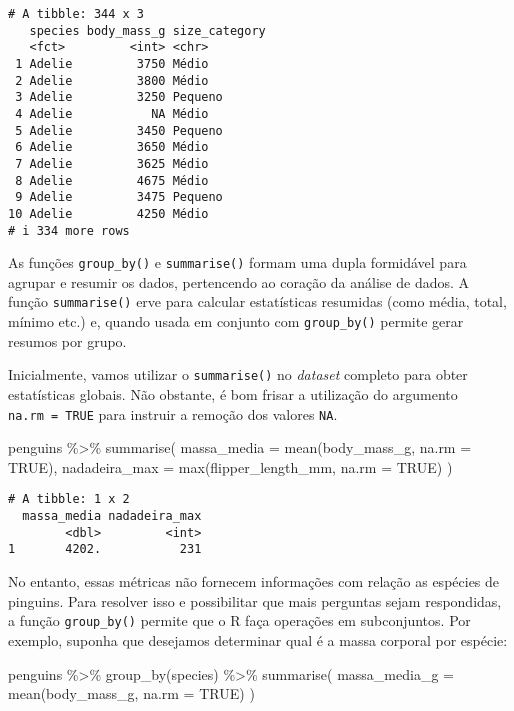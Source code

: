 \documentclass[
  12pt,
  letterpaper,
  DIV=11,
  numbers=noendperiod]{scrreprt}
\newenvironment{Shaded}{\begin{snugshade}}{\end{snugshade}}
\newcommand{\AttributeTok}[1]{\textcolor[rgb]{0.40,0.45,0.13}{#1}}
\newcommand{\ConstantTok}[1]{\textcolor[rgb]{0.56,0.35,0.01}{#1}}
\newcommand{\FunctionTok}[1]{\textcolor[rgb]{0.28,0.35,0.67}{#1}}
\newcommand{\NormalTok}[1]{\textcolor[rgb]{0.00,0.23,0.31}{#1}}
\newcommand{\SpecialCharTok}[1]{\textcolor[rgb]{0.37,0.37,0.37}{#1}}
\begin{document}
\begin{verbatim}
# A tibble: 344 x 3
   species body_mass_g size_category
   <fct>         <int> <chr>        
 1 Adelie         3750 Médio        
 2 Adelie         3800 Médio        
 3 Adelie         3250 Pequeno      
 4 Adelie           NA Médio        
 5 Adelie         3450 Pequeno      
 6 Adelie         3650 Médio        
 7 Adelie         3625 Médio        
 8 Adelie         4675 Médio        
 9 Adelie         3475 Pequeno      
10 Adelie         4250 Médio        
# i 334 more rows
\end{verbatim}

As funções \texttt{group\_by()} e \texttt{summarise()} formam uma dupla
formidável para agrupar e resumir os dados, pertencendo ao coração da
análise de dados. A função \texttt{summarise()} erve para calcular
estatísticas resumidas (como média, total, mínimo etc.) e, quando usada
em conjunto com \texttt{group\_by()} permite gerar resumos por grupo.

Inicialmente, vamos utilizar o \texttt{summarise()} no \emph{dataset}
completo para obter estatísticas globais. Não obstante, é bom frisar a
utilização do argumento \texttt{na.rm\ =\ TRUE} para instruir a remoção
dos valores \texttt{NA}.

\begin{Shaded}
\begin{Highlighting}[]
\NormalTok{penguins }\SpecialCharTok{\%\textgreater{}\%} 
  \FunctionTok{summarise}\NormalTok{(}
    \AttributeTok{massa\_media =} \FunctionTok{mean}\NormalTok{(body\_mass\_g, }\AttributeTok{na.rm =} \ConstantTok{TRUE}\NormalTok{),}
    \AttributeTok{nadadeira\_max =} \FunctionTok{max}\NormalTok{(flipper\_length\_mm, }\AttributeTok{na.rm =} \ConstantTok{TRUE}\NormalTok{)}
\NormalTok{  )}
\end{Highlighting}
\end{Shaded}

\begin{verbatim}
# A tibble: 1 x 2
  massa_media nadadeira_max
        <dbl>         <int>
1       4202.           231
\end{verbatim}

No entanto, essas métricas não fornecem informações com relação as
espécies de pinguins. Para resolver isso e possibilitar que mais
perguntas sejam respondidas, a função \texttt{group\_by()} permite que o
R faça operações em subconjuntos. Por exemplo, suponha que desejamos
determinar qual é a massa corporal por espécie:

\begin{Shaded}
\begin{Highlighting}[]
\NormalTok{penguins }\SpecialCharTok{\%\textgreater{}\%} 
  \FunctionTok{group\_by}\NormalTok{(species) }\SpecialCharTok{\%\textgreater{}\%} 
  \FunctionTok{summarise}\NormalTok{(}
    \AttributeTok{massa\_media\_g =} \FunctionTok{mean}\NormalTok{(body\_mass\_g, }\AttributeTok{na.rm =} \ConstantTok{TRUE}\NormalTok{)}
\NormalTok{  )}
\end{Highlighting}
\end{Shaded}
\end{document}
